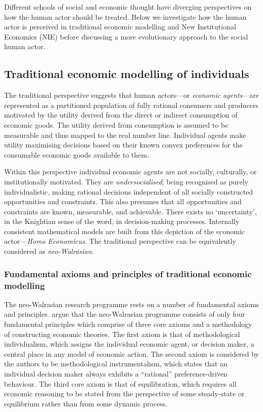 Different schools of social and economic thought have diverging perspectives on how the human actor should be treated. Below we investigate how the human actor is perceived in traditional economic modelling and New Institutional Economics (NIE) before discussing a more evolutionary approach to the social human actor.

\subsection{Traditional economic modelling of individuals}

The traditional perspective suggests that human actors---or \emph{economic agents}---are represented as a partitioned population of fully rational consumers and producers motivated by the utility derived from the direct or indirect consumption of economic goods. The utility derived from consumption is assumed to be measurable and thus mapped to the real number line. Individual agents make utility maximising decisions based on their known convex preferences for the consumable economic goods available to them. 

Within this perspective individual economic agents are not socially, culturally, or institutionally motivated. They are \emph{undersocialised}; being recognised as purely individualistic, making rational decisions independent of all socially constructed opportunities and constraints. This also presumes that all opportunities and constraints are known, measurable, and achievable. There exists no `uncertainty', in the Knightian sense of the word, in decision-making processes. Internally consistent mathematical models are built from this depiction of the economic actor---\emph{Homo Economicus}. The traditional perspective can be equivalently considered as \emph{neo-Walrasian}.

\subsubsection{Fundamental axioms and principles of traditional economic modelling}

The neo-Walrasian research programme rests on a number of fundamental axioms and principles. \citet{Arnsperger2006} argue that the neo-Walrasian programme consists of only four fundamental principles which comprise of three core axioms and a methodology of constructing economic theories. The first axiom is that of methodological individualism, which assigns the individual economic agent, or decision maker, a central place in any model of economic action. The second axiom is considered by the authors to be methodological instrumentalism, which states that an individual decision maker always exhibits a ``rational'' preference-driven behaviour. The third core axiom is that of equilibration, which requires all economic reasoning to be stated from the perspective of some steady-state or equilibrium rather than from some dynamic process.

